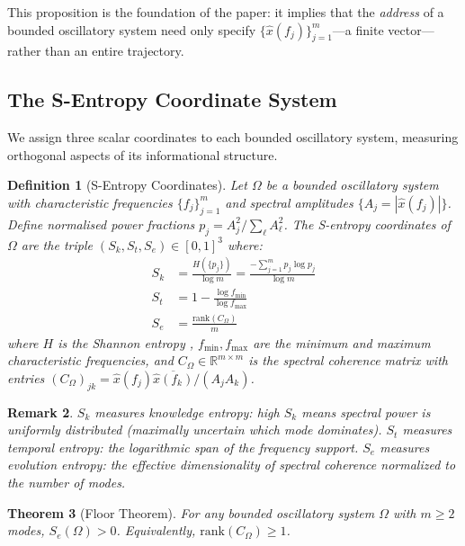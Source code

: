 \documentclass[10pt,twocolumn]{article}
\newtheorem{theorem}{Theorem}[section]
\newtheorem{definition}[theorem]{Definition}
\newtheorem{remark}[theorem]{Remark}
\newcommand{\R}{\mathbb{R}}
\begin{document}
This proposition is the foundation of the paper: it implies that the
\emph{address} of a bounded oscillatory system need only specify
$\{\hat{x}(f_j)\}_{j=1}^m$---a finite vector---rather than an entire trajectory.

\subsection{The S-Entropy Coordinate System}

We assign three scalar coordinates to each bounded oscillatory system,
measuring orthogonal aspects of its informational structure.

\begin{definition}[S-Entropy Coordinates]
\label{def:sentropy}
Let $\Omega$ be a bounded oscillatory system with characteristic frequencies
$\{f_j\}_{j=1}^m$ and spectral amplitudes $\{A_j = |\hat{x}(f_j)|\}$.
Define normalised power fractions $p_j = A_j^2 / \sum_\ell A_\ell^2$.
The \emph{S-entropy coordinates} of $\Omega$ are the triple
$(S_k, S_t, S_e) \in [0,1]^3$ where:
\begin{align}
S_k &= \frac{H(\{p_j\})}{\log m}
       = \frac{-\sum_{j=1}^m p_j \log p_j}{\log m}
       \label{eq:Sk}\\
S_t &= 1 - \frac{\log f_{\min}}{\log f_{\max}}
       \label{eq:St}\\
S_e &= \frac{\text{rank}(C_\Omega)}{m}
       \label{eq:Se}
\end{align}
where $H$ is the Shannon entropy \cite{shannon1948},
$f_{\min}, f_{\max}$ are the minimum and maximum characteristic frequencies,
and $C_\Omega \in \R^{m \times m}$ is the spectral coherence matrix with
entries $(C_\Omega)_{jk} = \hat{x}(f_j)\overline{\hat{x}(f_k)} / (A_j A_k)$.
\end{definition}

\begin{remark}
$S_k$ measures \emph{knowledge entropy}: high $S_k$ means spectral power is
uniformly distributed (maximally uncertain which mode dominates).
$S_t$ measures \emph{temporal entropy}: the logarithmic span of the
frequency support. $S_e$ measures \emph{evolution entropy}: the effective
dimensionality of spectral coherence normalized to the number of modes.
\end{remark}

\begin{theorem}[Floor Theorem]
\label{thm:floor}
For any bounded oscillatory system $\Omega$ with $m \geq 2$ modes,
$S_e(\Omega) > 0$. Equivalently, $\text{rank}(C_\Omega) \geq 1$.
\end{theorem}
\end{document}
